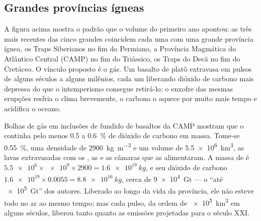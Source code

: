 
\subsection*{Grandes províncias ígneas}

A figura acima mostra o padrão que o volume do primeiro ano apontou: as três mais recentes das
cinco grandes coincidem cada uma com uma grande província ígnea, os Traps Siberianos no fim do Permiano,
a Província Magmática do Atlântico Central (CAMP) no fim do Triássico, os Traps do Decã no
fim do Cretáceo. O vínculo proposto é o gás. Um basalto de platô extravasa em pulsos de alguns
séculos a alguns milênios, cada um liberando dióxido de carbono mais depressa do que o intemperismo consegue
retirá-lo; o enxofre das mesmas erupções resfria o clima brevemente, o carbono o aquece por muito
mais tempo e acidifica o oceano.

\begin{example}\label{ex:b2:phanerozoic-earth:camp}
Bolhas de gás em inclusões de fundido de basaltos da CAMP mostram que o  continha pelo menos 0.5 a
\qty{0.6}{\percent} de dióxido de carbono em massa. Tome-se \qty{0.55}{\percent}, uma densidade de
\qty{2900}{kg.m^{-3}} e um volume de \qty{5.5e6}{km^3}, as lavas extravasadas com os , as 
e as câmaras que as alimentaram. A massa de  é $\num{5.5e6} \times \num{e9} \times 2900 =
\qty{1.6e19}{kg}$, e seu dióxido de carbono $\num{1.6e19} \times 0.0055 = \qty{8.8e16}{kg}$, cerca de
\qty{9e4}{Gt} --- o ``até \qty{e5}{Gt}'' dos autores. Liberado ao longo da vida da província, ele
não esteve todo no ar ao mesmo tempo; mas cada pulso, da ordem de \qty{e5}{km^3} em alguns
séculos, liberou tanto quanto as emissões projetadas para o século XXI.
\end{example}

